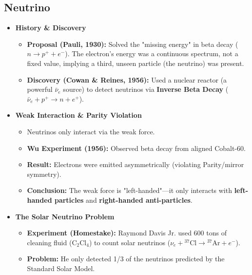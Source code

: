 \documentclass{sciposter}
\begin{document}
\begin{multicols}{3}
\section{Neutrino}


\begin{itemize}
    \item \textbf{History \& Discovery}
    \begin{itemize}
        \item \textbf{Proposal (Pauli, 1930):} Solved the "missing energy" in beta decay ($n \rightarrow p^+ + e^-$). The electron's energy was a continuous spectrum, not a fixed value, implying a third, unseen particle (the neutrino) was present.
        \item \textbf{Discovery (Cowan \& Reines, 1956):} Used a nuclear reactor (a powerful $\bar{\nu}_e$ source) to detect neutrinos via \textbf{Inverse Beta Decay} ($\bar{\nu}_e + p^+ \rightarrow n + e^+$).
    \end{itemize}

    \item \textbf{Weak Interaction \& Parity Violation}
    \begin{itemize}
        \item Neutrinos only interact via the weak force.
        \item \textbf{Wu Experiment (1956):} Observed beta decay from aligned Cobalt-60.
        \item \textbf{Result:} Electrons were emitted asymmetrically (violating Parity/mirror symmetry).
        \item \textbf{Conclusion:} The weak force is "left-handed"---it only interacts with \textbf{left-handed particles} and \textbf{right-handed anti-particles}.
    \end{itemize}

    \item \textbf{The Solar Neutrino Problem}
    \begin{itemize}
        \item \textbf{Experiment (Homestake):} Raymond Davis Jr. used 600 tons of cleaning fluid ($\text{C}_2\text{Cl}_4$) to count solar neutrinos ($\nu_e + {}^{37}\text{Cl} \rightarrow {}^{37}\text{Ar} + e^-$).
        \item \textbf{Problem:} He only detected 1/3 of the neutrinos predicted by the Standard Solar Model.
    \end{itemize}


\end{itemize}
\end{multicols}
\end{document}
